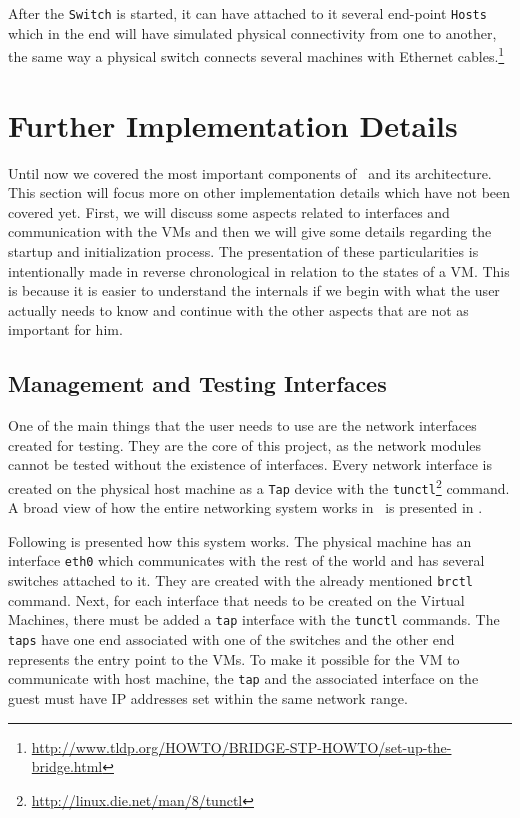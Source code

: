 After the \texttt{Switch} is started, it can have attached to it several end-point \texttt{Hosts} which in the end will have simulated physical connectivity from one to another, the same way a physical switch connects several machines with Ethernet cables.\footnote{\url{http://www.tldp.org/HOWTO/BRIDGE-STP-HOWTO/set-up-the-bridge.html}}


\section{Further Implementation Details}
\label{sec:implementation}

Until now we covered the most important components of \project\ and its architecture.
This section will focus more on other implementation details which have not been covered yet.
First, we will discuss some aspects related to interfaces and communication with the VMs and then we will give some details regarding the startup and initialization process.
The presentation of these particularities is intentionally made in reverse chronological in relation to the states of a VM.
This is because it is easier to understand the internals if we begin with what the user actually needs to know and continue with the other aspects that are not as important for him.

\subsection{Management and Testing Interfaces}
\label{sub-sec:mgmt-and-testing-intf}

One of the main things that the user needs to use are the network interfaces created for testing.
They are the core of this project, as the network modules cannot be tested without the existence of interfaces.
Every network interface is created on the physical host machine as a \texttt{Tap} device with the \texttt{tunctl}\footnote{\url{http://linux.die.net/man/8/tunctl}} command.
A broad view of how the entire networking system works in \project\ is presented in .


Following is presented how this system works.
The physical machine has an interface \texttt{eth0} which communicates with the rest of the world and has several switches attached to it.
They are created with the already mentioned \texttt{brctl} command.
Next, for each interface that needs to be created on the Virtual Machines, there must be added a \texttt{tap} interface with the \texttt{tunctl} commands.
The \texttt{taps} have one end associated with one of the switches and the other end represents the entry point to the VMs.
To make it possible for the VM to communicate with host machine, the \texttt{tap} and the associated interface on the guest must have IP addresses set within the same network range.

